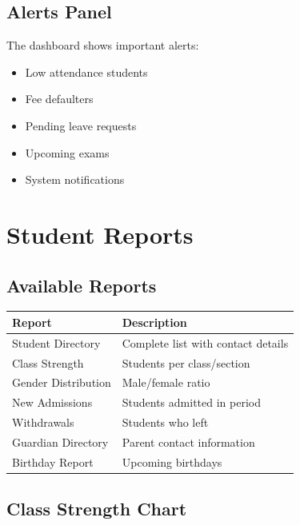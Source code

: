 \documentclass[12pt,a4paper]{report}
\begin{document}
\section{Alerts Panel}

The dashboard shows important alerts:
\begin{itemize}[leftmargin=*]
    \item Low attendance students
    \item Fee defaulters
    \item Pending leave requests
    \item Upcoming exams
    \item System notifications
\end{itemize}

\chapter{Student Reports}

\section{Available Reports}

\begin{longtable}{@{}p{4.5cm}p{8.5cm}@{}}
\toprule
\textbf{Report} & \textbf{Description} \\
\midrule
\endhead
Student Directory & Complete list with contact details \\
Class Strength & Students per class/section \\
Gender Distribution & Male/female ratio \\
New Admissions & Students admitted in period \\
Withdrawals & Students who left \\
Guardian Directory & Parent contact information \\
Birthday Report & Upcoming birthdays \\
\bottomrule
\end{longtable}

\section{Class Strength Chart}
\end{document}
